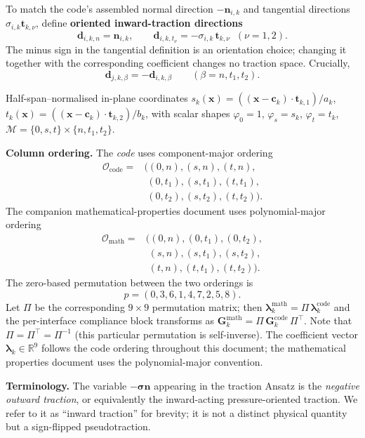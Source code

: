 \documentclass[11pt,a4paper]{article}
\newcommand{\R}{\mathbb{R}}
\newcommand{\stress}{\bm{\sigma}}
\newcommand{\normal}{\bm{n}}
\newcommand{\trac}{\bm{\lambda}}
\newcommand{\DtN}{\mathbf{G}}
\newcommand{\modeset}{\mathcal{M}}
\begin{document}
To match the code's assembled normal direction $-\normal_{i,k}$ and
tangential directions $\sigma_{i,k}\bm{t}_{k,\nu}$, define
\textbf{oriented inward-traction directions}
\begin{equation}\label{eq:dir}
  \bm{d}_{i,k,n} = \normal_{i,k},\qquad
  \bm{d}_{i,k,t_\nu} = -\sigma_{i,k}\,\bm{t}_{k,\nu}\;\;(\nu=1,2).
\end{equation}
The minus sign in the tangential definition is an orientation choice;
changing it together with the corresponding coefficient changes no
traction space.  Crucially,
\begin{equation}\label{eq:opposite}
  \bm{d}_{j,k,\beta} = -\bm{d}_{i,k,\beta}
  \qquad (\beta = n,t_1,t_2).
\end{equation}

Half-span--normalised in-plane coordinates
$s_k(\bm{x}) = ((\bm{x}-\bm{c}_k)\cdot\bm{t}_{k,1})/a_k$,
$t_k(\bm{x}) = ((\bm{x}-\bm{c}_k)\cdot\bm{t}_{k,2})/b_k$,
with scalar shapes $\varphi_0=1$, $\varphi_s=s_k$, $\varphi_t=t_k$,
$\modeset = \{0,s,t\}\times\{n,t_1,t_2\}$.

\textbf{Column ordering.}
The \emph{code} uses component-major ordering
\[
\begin{aligned}
\mathcal O_{\mathrm{code}}={}&
\bigl((0,n),(s,n),(t,n),\\
& \;(0,t_1),(s,t_1),(t,t_1),\\
& \;(0,t_2),(s,t_2),(t,t_2)\bigr).
\end{aligned}
\]
The companion mathematical-properties document uses
polynomial-major ordering
\[
\begin{aligned}
\mathcal O_{\mathrm{math}}={}&
\bigl((0,n),(0,t_1),(0,t_2),\\
& \;(s,n),(s,t_1),(s,t_2),\\
& \;(t,n),(t,t_1),(t,t_2)\bigr).
\end{aligned}
\]
The zero-based permutation between the two orderings is
\[
p = (0,3,6,1,4,7,2,5,8).
\]
Let $\Pi$ be the corresponding $9\times 9$ permutation matrix;
then $\trac_k^{\mathrm{math}} = \Pi\,\trac_k^{\mathrm{code}}$ and the
per-interface compliance block transforms as
$\DtN_k^{\mathrm{math}} = \Pi\,\DtN_k^{\mathrm{code}}\,\Pi^\top$.
Note that $\Pi = \Pi^\top = \Pi^{-1}$ (this particular permutation is
self-inverse).
The coefficient vector $\trac_k \in \R^9$ follows the code ordering
throughout this document; the mathematical properties document uses
the polynomial-major convention.

\textbf{Terminology.}  The variable $-\stress\normal$ appearing in the
traction Ansatz is the \emph{negative outward traction}, or
equivalently the inward-acting pressure-oriented traction.
We refer to it as ``inward traction'' for brevity; it is not a
distinct physical quantity but a sign-flipped pseudotraction.
\end{document}
